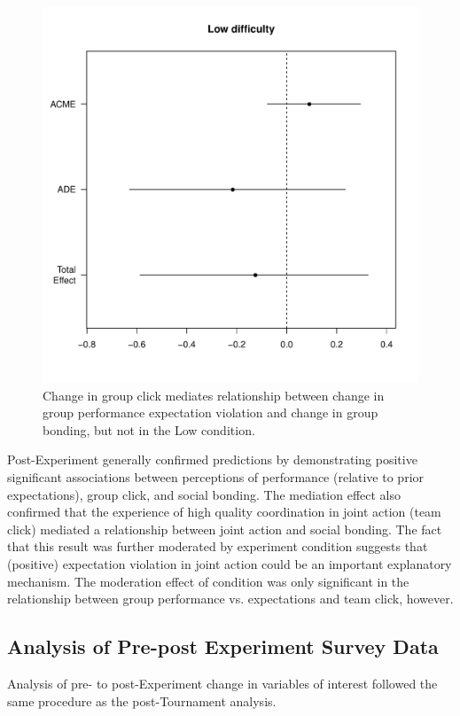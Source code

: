 \begin{figure}
  \centering
  \includegraphics[width=0.5\linewidth,keepaspectratio] {images/groupPerfExpClickMediationPlotLow}
  \caption{Change in group click mediates relationship between change in group performance expectation violation and change in group bonding, but not in the Low condition.}
  \label{fig:groupPerfClickChangeMedPlotLow}
\end{figure}








Post-Experiment generally confirmed predictions by demonstrating positive significant associations between perceptions of performance (relative to prior expectations), group click, and social bonding.  The mediation effect also confirmed that the experience of high quality coordination in joint action (team click) mediated a relationship between joint action and social bonding.  The fact that this result was further moderated by experiment condition suggests that (positive) expectation violation in joint action could be an important explanatory mechanism.  The moderation effect of condition was only significant in the relationship between group performance vs. expectations and team click, however.











\subsection{Analysis of Pre-post Experiment Survey Data}

Analysis of pre- to post-Experiment change in variables of interest followed the same procedure as the post-Tournament analysis.


